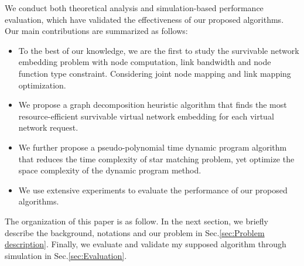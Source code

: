We conduct both theoretical analysis and simulation-based performance evaluation, which have validated the effectiveness of our proposed algorithms. Our main contributions are summarized as follows:
\begin{itemize}
  \item To the best of our knowledge, we are the first to study the survivable network embedding problem with node computation, link bandwidth and node function type constraint. Considering joint node mapping and link mapping optimization.
  \item We propose a graph decomposition heuristic  algorithm that finds the most resource-efficient survivable virtual network embedding for each virtual network request.
  \item We further propose a pseudo-polynomial time dynamic program algorithm that reduces the time complexity of star matching problem, yet optimize the space complexity of the dynamic program method.
  \item We use extensive experiments to evaluate the performance of our proposed algorithms.
\end{itemize}



The organization of this paper is as follow. In the next section, we briefly describe the background, notations and our problem in Sec.\ref{sec:Problem description}. Finally, we evaluate and validate my supposed algorithm through simulation in Sec.\ref{sec:Evaluation}.


